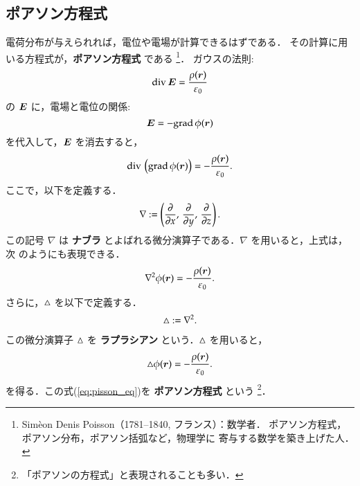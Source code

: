         \subsection{ポアソン方程式}\label{subsec:pisson_eq}
            電荷分布が与えられれば，電位や電場が計算できるはずである．
            その計算に用いる方程式が，\textbf{ポアソン方程式} である
                \footnote{
                    Sim\`{e}on Denis Poisson（1781--1840, フランス）：数学者．
                    ポアソン方程式，ポアソン分布，ポアソン括弧など，物理学に
                    寄与する数学を築き上げた人．
                }．
            ガウスの法則:
                \begin{equation*}
                    \mathrm{div}\, \boldsymbol{E} = \frac{\rho(\boldsymbol{r})}{\varepsilon_{0}}
                \end{equation*}
            の $\boldsymbol{E}$ に，電場と電位の関係:
                \begin{equation*}
                    \boldsymbol{E} = - \mathrm{grad}\, \phi(\boldsymbol{r})
                \end{equation*}
            を代入して，$\boldsymbol{E}$ を消去すると，
                \begin{equation*}
                    \mathrm{div}\, \left( \mathrm{grad}\, \phi(\boldsymbol{r}) \right) = - \frac{\rho(\boldsymbol{r})}{\varepsilon_{0}}.
                \end{equation*}
            ここで，以下を定義する．
                \begin{align}
                    \nabla := \left(\frac{\partial}{\partial x} ,\, \frac{\partial}{\partial y} ,\, \frac{\partial}{\partial z}\right).
                \end{align}
            この記号 $\nabla$ は \textbf{ナブラ} とよばれる微分演算子である．$\nabla$ を用いると，上式は，次
            のようにも表現できる．
                \begin{equation*}
                    {\nabla}^{2} \phi(\boldsymbol{r}) = - \frac{\rho(\boldsymbol{r})}{\varepsilon_{0}}.
                \end{equation*}
            さらに，$\triangle$ を以下で定義する．
                \begin{align}
                    \triangle := {\nabla}^{2}.
                \end{align}
            この微分演算子 $\triangle$ を \textbf{ラプラシアン} という．$\triangle$ を用いると，
                \begin{align}\label{eq:pisson_eq}
                    \Lap \phi(\br) = - \frac{\rho(\br)}{\varepsilon_{0}}.
                \end{align}
            を得る．この式(\ref{eq:pisson_eq})を \textbf{ポアソン方程式} という
                \footnote{
                    「ポアソンの方程式」と表現されることも多い．
                }．

